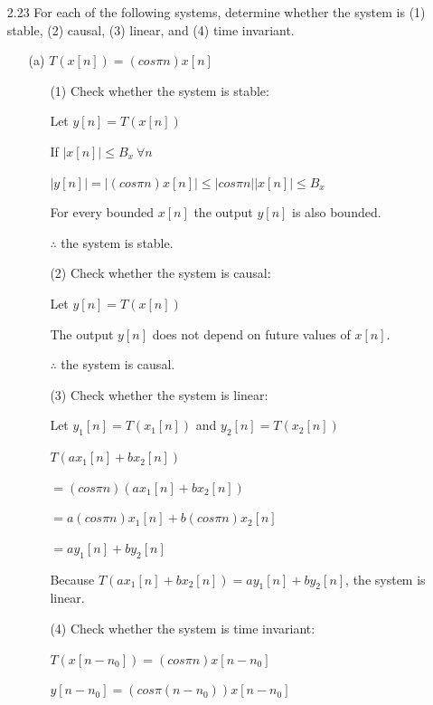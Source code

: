 \documentclass[fleqn]{article}
\begin{document}
\begin{enumerate}[nolistsep]
\begin{enumerate}[nolistsep]
		\end{enumerate}
		
		\item[2.23] For each of the following systems, determine whether the system is (1) stable, (2) causal, (3) linear, and (4) time invariant.
		
		\begin{enumerate}[nolistsep]
			\item[(a)] $T(x[n]) = (cos{\pi}n)x[n]$
			
				\begin{enumerate}[nolistsep]
				
					\item[(1)] Check whether the system is stable:
			
					Let $y[n] = T(x[n])$
			
					If $|x[n]| \leq B_x\ \forall n$
			
					$|y[n]| = |(cos{\pi}n)x[n]| \leq |cos{\pi}n||x[n]| \leq B_x$
			
					For every bounded $x[n]$ the output $y[n]$ is also bounded.
			
					$\therefore$ the system is stable.
					
					\item[(2)] Check whether the system is causal:
					
					Let $y[n] = T(x[n])$
					
					The output $y[n]$ does not depend on future values of $x[n]$.
					
					$\therefore$ the system is causal.
					
					\item[(3)] Check whether the system is linear:
					
					Let $y_1[n] = T(x_1[n])$ and $y_2[n] = T(x_2[n])$
					
					$T(ax_1[n] + bx_2[n])$
					
					$ = (cos{\pi}n)(ax_1[n] + bx_2[n])$
					
					$ = a(cos{\pi}n)x_1[n] + b(cos{\pi}n)x_2[n]$
					
					$ = ay_1[n] + by_2[n]$
					
					Because $T(ax_1[n] + bx_2[n]) = ay_1[n] + by_2[n]$, the system is linear.
					
					\item[(4)] Check whether the system is time invariant:
					
					$T(x[n-n_0]) = (cos{\pi}n)x[n-n_0]$
					
					$y[n-n_0] = (cos{\pi}(n-n_0))x[n-n_0]$
					

\end{enumerate}
\end{enumerate}
\end{enumerate}
\end{document}
